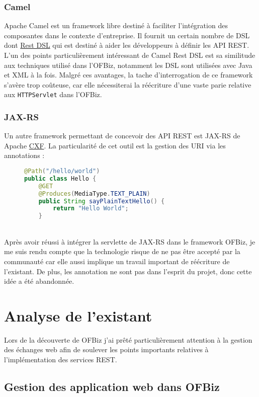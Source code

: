 \subsubsection{Camel}
Apache Camel est un framework libre destiné à faciliter l'intégration des composantes dans le contexte d'entreprise. Il fournit un certain nombre de DSL dont \href{https://camel.apache.org/rest-dsl.html}{Rest DSL} qui est destiné à aider les développeurs à définir les API REST. 
L'un des points particulièrement intéressant de Camel Rest DSL est sa similitude aux techniques utilisé dans l'OFBiz, notamment les DSL sont utilisées avec Java et XML à la fois. 
Malgré ces avantages, la tache d'interrogation de ce framework s'avère trop coûteuse, car elle nécessiterai la réécriture d'une vaste parie relative aux \verb|HTTPServlet| dans l'OFBiz. 
\subsubsection{JAX-RS}
Un autre framework permettant de concevoir des API REST est JAX-RS de Apache \href{http://cxf.apache.org/}{CXF}. La particularité de cet outil est la gestion des URI via les annotations : 
\begin{figure}[h!]
	\begin{lstlisting}[language=Java]
@Path("/hello/world")
public class Hello {	
	@GET
	@Produces(MediaType.TEXT_PLAIN)
	public String sayPlainTextHello() {
		return "Hello World";
	}
	\end{lstlisting}
\end{figure}\\
Après avoir réussi à intégrer la servlette de JAX-RS dans le framework OFBiz, 
je me suis rendu compte que la technologie risque de ne pas être accepté par la communauté  car elle aussi implique un travail important de réécriture de l'existant. De plus, les annotation ne sont pas dans l'esprit du projet, donc cette idée a été abandonnée. 


\newpage

\section{Analyse de l'existant}

Lors de la découverte de OFBiz j'ai prêté  particulièrement attention à la gestion des échanges web afin de soulever les points importants relatives à l'implémentation des services REST. 


\subsection{Gestion des application web dans OFBiz}


